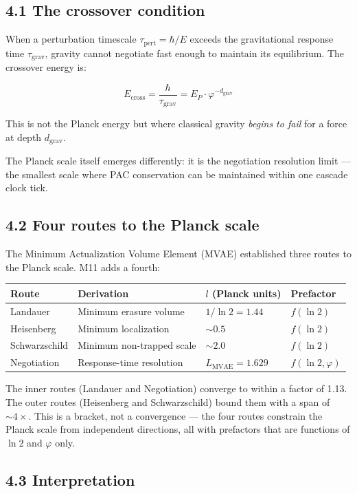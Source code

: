 \documentclass[11pt,a4paper]{article}
\begin{document}
\subsection*{4.1 The crossover condition}

When a perturbation timescale $\tau_{\text{pert}} = \hbar / E$ exceeds the gravitational response time $\tau_{\text{grav}}$, gravity cannot negotiate fast enough to maintain its equilibrium. The crossover energy is:

\[E_{\text{cross}} = \frac{\hbar}{\tau_{\text{grav}}} = E_P \cdot \varphi^{-d_{\text{grav}}}\]

This is not the Planck energy but where classical gravity \emph{begins to fail} for a force at depth $d_{\text{grav}}$.

The Planck scale itself emerges differently: it is the negotiation resolution limit — the smallest scale where PAC conservation can be maintained within one cascade clock tick.

\subsection*{4.2 Four routes to the Planck scale}

The Minimum Actualization Volume Element (MVAE) established three routes to the Planck scale. M11 adds a fourth:

\begin{longtable}[]{@{}llll@{}}
\toprule
Route & Derivation & $l$ (Planck units) & Prefactor \\
\midrule\endhead
Landauer & Minimum erasure volume & $1/\ln 2 = 1.44$ & $f(\ln 2)$ \\
Heisenberg & Minimum localization & $\sim 0.5$ & $f(\ln 2)$ \\
Schwarzschild & Minimum non-trapped scale & $\sim 2.0$ & $f(\ln 2)$ \\
Negotiation & Response-time resolution & $L_{\text{MVAE}} = 1.629$ & $f(\ln 2, \varphi)$ \\
\bottomrule
\end{longtable}

The inner routes (Landauer and Negotiation) converge to within a factor of 1.13. The outer routes (Heisenberg and Schwarzschild) bound them with a span of $\sim 4\times$. This is a bracket, not a convergence — the four routes constrain the Planck scale from independent directions, all with prefactors that are functions of $\ln 2$ and $\varphi$ only.

\subsection*{4.3 Interpretation}
\end{document}
